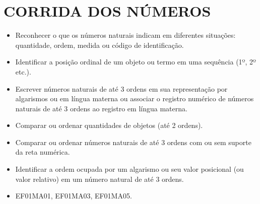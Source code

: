 \chapter{CORRIDA DOS NÚMEROS}



\begin{itemize}
\item
  Reconhecer o que os números naturais indicam em diferentes situações:
  quantidade, ordem, medida ou código de identificação.
\item
  Identificar a posição ordinal de um objeto ou termo em uma sequência
  (1º, 2º etc.).
\item
  Escrever números naturais de até 3 ordens em sua representação por
  algarismos ou em língua materna ou associar o registro numérico de
  números naturais de até 3 ordens ao registro em língua materna.
\item
  Comparar ou ordenar quantidades de objetos (até 2 ordens).
\item
  Comparar ou ordenar números naturais de até 3 ordens com ou sem
  suporte da reta numérica.
\item
  Identificar a ordem ocupada por um algarismo ou seu valor posicional
  (ou valor relativo) em um número natural de até 3 ordens.
\end{itemize}


\begin{itemize}
  \item EF01MA01, EF01MA03, EF01MA05.
\end{itemize}


